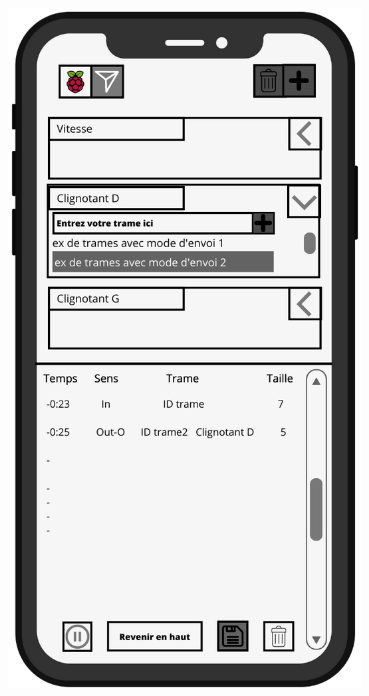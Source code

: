 \begin{minipage}{0.5\linewidth}
    \centering
    \includegraphics[width=0.7\textwidth]{sections/3_Exigences_specifiques/1_IHM/ihm/ecranPrincipalTrameEnCours.png}
    \captionsetup{justification=centering}
    \label{ecran_trame_envoi}
\end{minipage} \newline 
\vspace{1cm}

